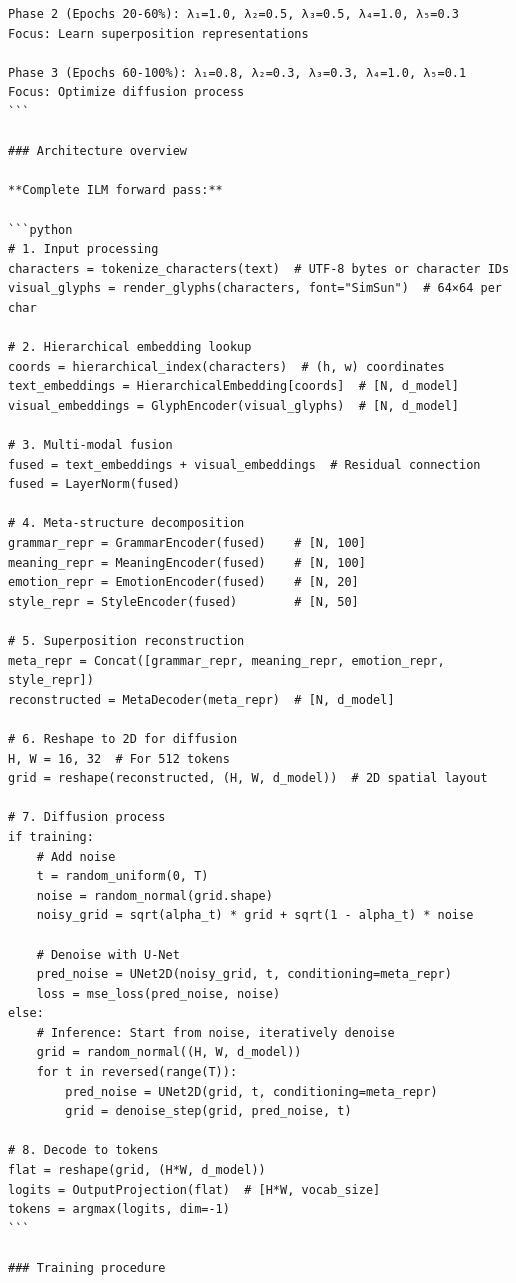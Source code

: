 \documentclass[11pt]{article}
\begin{document}
\begin{verbatim}
Phase 2 (Epochs 20-60%): λ₁=1.0, λ₂=0.5, λ₃=0.5, λ₄=1.0, λ₅=0.3
Focus: Learn superposition representations

Phase 3 (Epochs 60-100%): λ₁=0.8, λ₂=0.3, λ₃=0.3, λ₄=1.0, λ₅=0.1
Focus: Optimize diffusion process
```

### Architecture overview

**Complete ILM forward pass:**

```python
# 1. Input processing
characters = tokenize_characters(text)  # UTF-8 bytes or character IDs
visual_glyphs = render_glyphs(characters, font="SimSun")  # 64×64 per char

# 2. Hierarchical embedding lookup
coords = hierarchical_index(characters)  # (h, w) coordinates
text_embeddings = HierarchicalEmbedding[coords]  # [N, d_model]
visual_embeddings = GlyphEncoder(visual_glyphs)  # [N, d_model] 

# 3. Multi-modal fusion
fused = text_embeddings + visual_embeddings  # Residual connection
fused = LayerNorm(fused)

# 4. Meta-structure decomposition
grammar_repr = GrammarEncoder(fused)    # [N, 100]
meaning_repr = MeaningEncoder(fused)    # [N, 100]  
emotion_repr = EmotionEncoder(fused)    # [N, 20]
style_repr = StyleEncoder(fused)        # [N, 50]

# 5. Superposition reconstruction  
meta_repr = Concat([grammar_repr, meaning_repr, emotion_repr, style_repr])
reconstructed = MetaDecoder(meta_repr)  # [N, d_model]

# 6. Reshape to 2D for diffusion
H, W = 16, 32  # For 512 tokens
grid = reshape(reconstructed, (H, W, d_model))  # 2D spatial layout

# 7. Diffusion process
if training:
    # Add noise
    t = random_uniform(0, T)
    noise = random_normal(grid.shape)
    noisy_grid = sqrt(alpha_t) * grid + sqrt(1 - alpha_t) * noise
    
    # Denoise with U-Net
    pred_noise = UNet2D(noisy_grid, t, conditioning=meta_repr)
    loss = mse_loss(pred_noise, noise)
else:
    # Inference: Start from noise, iteratively denoise
    grid = random_normal((H, W, d_model))
    for t in reversed(range(T)):
        pred_noise = UNet2D(grid, t, conditioning=meta_repr)
        grid = denoise_step(grid, pred_noise, t)

# 8. Decode to tokens
flat = reshape(grid, (H*W, d_model))
logits = OutputProjection(flat)  # [H*W, vocab_size]
tokens = argmax(logits, dim=-1)
```

### Training procedure


\end{verbatim}
\end{document}
